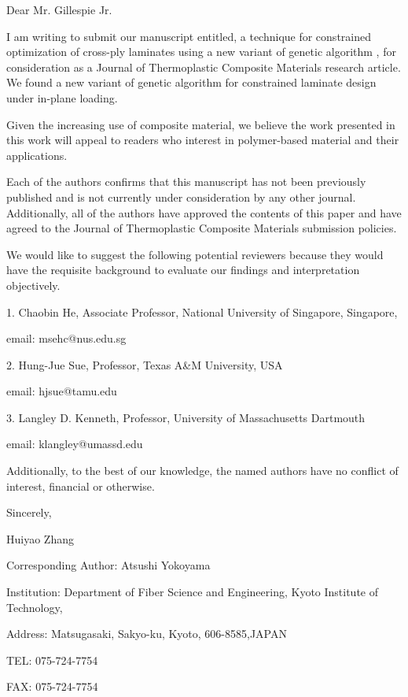 \documentclass{article}
\begin{document}
Dear Mr. Gillespie Jr.

\vskip 0.1in
I am writing to submit our manuscript entitled, a technique for constrained
optimization of cross-ply laminates using a new variant of genetic algorithm ,
for consideration as a Journal of Thermoplastic Composite Materials  research
article. We found a new variant of genetic algorithm for constrained laminate
design under in-plane loading.


\vskip 0.1in
Given the increasing use of composite material, we believe the work presented in this work will
appeal to readers who interest in polymer-based material and their applications. 

\vskip 0.1in

Each of the authors confirms that this manuscript has not been previously published and is not
currently under consideration by any other journal. Additionally, all of the authors have approved
the contents of this paper and have agreed to the Journal of Thermoplastic Composite Materials submission
policies.

\vskip 0.1in

We would like to suggest the following potential
reviewers because they would have the requisite background to evaluate our findings and
interpretation objectively.

\vskip 0.05in
1.  Chaobin He, Associate Professor, National University of Singapore, Singapore,

	email: msehc@nus.edu.sg 

\vskip 0.02in
2.  Hung-Jue Sue, Professor,  Texas A\&M University, USA 

	email: hjsue@tamu.edu 
\vskip 0.02in

3.  Langley D. Kenneth,  Professor, University of Massachusetts Dartmouth 

	email: klangley@umassd.edu
\vskip 0.05in


Additionally, to the best of our knowledge, the named authors have no conflict of
interest, financial or otherwise.

\vskip 0.15in

Sincerely,

Huiyao Zhang

\vskip 0.2in
Corresponding Author: Atsushi Yokoyama

Institution: Department of Fiber Science and Engineering, Kyoto Institute of Technology,

Address:   Matsugasaki, Sakyo-ku, Kyoto, 606-8585,JAPAN

TEL: 075-724-7754  

FAX:  075-724-7754
\end{document}
